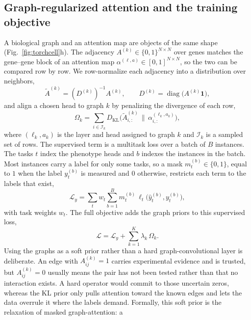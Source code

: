 \subsection*{Graph-regularized attention and the training objective}
A biological graph and an attention map are objects of the same shape
(Fig.~\ref{fig:torchcell}h). The adjacency
$A^{(k)}\in\{0,1\}^{N\times N}$ over genes matches the gene--gene block of an attention map
$\alpha^{(\ell,a)}\in[0,1]^{N\times N}$, so the two can be compared row by row. We
row-normalize each adjacency into a distribution over neighbors,
\begin{equation}
\tilde{A}^{(k)}=(D^{(k)})^{-1}A^{(k)},\qquad
D^{(k)}=\operatorname{diag}\!\big(A^{(k)}\mathbf{1}\big),
\label{eq:rownorm}
\end{equation}
and align a chosen head to graph $k$ by penalizing the divergence of each row,
\begin{equation}
\Omega_k=\sum_{i\in\mathcal{I}_k}D_{\mathrm{KL}}\!\big(\tilde{A}^{(k)}_{i,:}\,\big\|\,\alpha^{(\ell_k,a_k)}_{i,:}\big),
\label{eq:graphreg}
\end{equation}
where $(\ell_k,a_k)$ is the layer and head assigned to graph $k$ and $\mathcal{I}_k$ is a
sampled set of rows. The supervised term is a multitask loss over a batch of $B$ instances.
The tasks $t$ index the phenotype heads and $b$ indexes the instances in the batch. Most
instances carry a label for only some tasks, so a mask $m_t^{(b)}\in\{0,1\}$, equal to $1$
when the label $y_t^{(b)}$ is measured and $0$ otherwise, restricts each term to the labels
that exist,
\begin{equation}
\mathcal{L}_{y}=\sum_{t}w_t\sum_{b=1}^{B}m_t^{(b)}\,\ell_t\!\big(\hat y_t^{(b)},y_t^{(b)}\big),
\label{eq:suploss}
\end{equation}
with task weights $w_t$. The full objective adds the graph priors to this supervised loss,
\begin{equation}
\mathcal{L}=\mathcal{L}_{y}+\sum_{k=1}^{K}\lambda_k\,\Omega_k.
\label{eq:loss}
\end{equation}
Using the graphs as a soft prior rather than a hard graph-convolutional layer is
deliberate. An edge with $A^{(k)}_{ij}=1$ carries experimental evidence and is trusted, but
$A^{(k)}_{ij}=0$ usually means the pair has not been tested rather than that no interaction
exists. A hard operator would commit to those uncertain zeros, whereas the KL prior only
pulls attention toward the known edges and lets the data overrule it where the labels
demand. Formally, this soft prior is the relaxation of masked graph-attention: a
